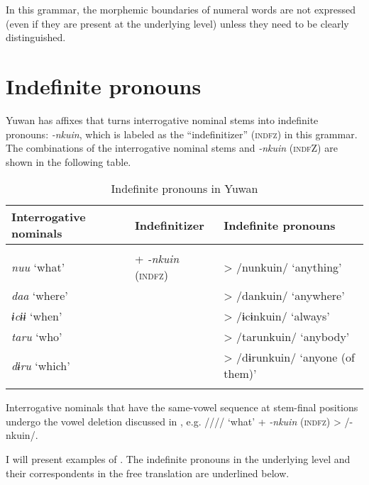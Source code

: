 In this grammar, the morphemic boundaries of numeral words are not expressed (even if they are present at the underlying level) unless they need to be clearly distinguished.

\section{Indefinite pronouns}

Yuwan has affixes that turns interrogative nominal stems into indefinite pronouns: \textit{{}-nkuin}, which is labeled as the “indefinitizer” (\textsc{indfz}) in this grammar. The combinations of the interrogative nominal stems and \textit{-nkuin} (\textsc{indf}Z) are shown in the following table.

\begin{table}
\caption{\label{tab:key:54} Indefinite pronouns in Yuwan}
\begin{tabular}{lll}
\lsptoprule
Interrogative nominals  &   Indefinitizer    & Indefinite pronouns\\
\midrule                                                                                                \\
\textit{nuu}  ‘what’   & +  \textit{{}-nkuin} (\textsc{indfz})&  >  /nunkuin/  ‘anything’               \\
\textit{daa}  ‘where’  &                                      &  >  /dankuin/  ‘anywhere’               \\
\textit{ɨcɨɨ}  ‘when’  &                                      &  >  /ɨcɨnkuin/  ‘always’                \\
\textit{taru}  ‘who’   &                                      & >  /tarunkuin/  ‘anybody’               \\
\textit{dɨru}  ‘which’ &                                      &   >  /dɨrunkuin/  ‘anyone (of them)’    \\
\lspbottomrule
\end{tabular}
\end{table}

Interrogative nominals that have the same-vowel sequence at stem-final positions undergo the vowel deletion discussed in , e.g. //// ‘what’ + \textit{{}-nkuin} (\textsc{indfz}) > /-nkuin/.

  I will present examples of . The indefinite pronouns in the underlying level and their correspondents in the free translation are underlined below.

